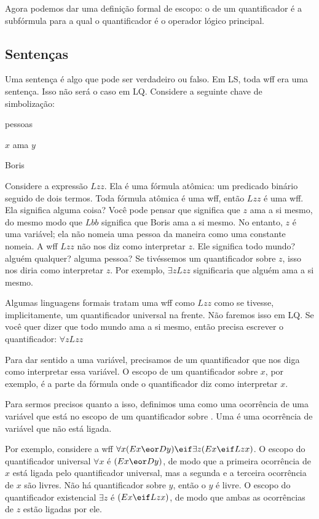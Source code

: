 Agora podemos dar uma definição formal de escopo: o  de um quantificador é a subfórmula para a qual o quantificador é o operador lógico principal. 

\subsection{Sentenças}

Uma {sentença} é algo que pode ser verdadeiro ou falso. Em LS, toda wff era uma sentença. Isso não será o caso em LQ. Considere a seguinte chave de simbolização:
\begin{ekey}
\item[UD:] pessoas
\item[Lxy:] $x$ ama $y$
\item[b:] Boris
\end{ekey}
Considere a expressão $Lzz$. Ela é uma fórmula atômica: um predicado binário seguido de dois termos. Toda fórmula atômica é uma wff, então $Lzz$ é uma wff. Ela significa alguma coisa? Você pode pensar que significa que $z$ ama a si mesmo, do mesmo modo que $Lbb$ significa que Boris ama a si mesmo. No entanto, $z$ é uma variável; ela não nomeia uma pessoa da maneira como uma constante nomeia. A wff $Lzz$ não nos diz como interpretar $z$. Ele significa todo mundo? alguém qualquer? alguma pessoa? Se tivéssemos um quantificador sobre $z$, isso nos diria como interpretar $z$. Por exemplo, $\exists zLzz$ significaria que alguém ama a si mesmo.

Algumas linguagens formais tratam uma wff como $Lzz$ como se tivesse, implicitamente, um quantificador universal na frente. Não faremos isso em LQ. Se você quer dizer que todo mundo ama a si mesmo, então precisa escrever o quantificador: $\forall zLzz$

Para dar sentido a uma variável, precisamos de um quantificador que nos diga como interpretar essa variável. O escopo de um quantificador sobre $x$, por exemplo, é a parte da fórmula onde o quantificador diz como interpretar $x$.

Para sermos precisos quanto a isso, definimos uma  como uma ocorrência de uma variável  que está no escopo de um quantificador sobre . Uma  é uma ocorrência de variável que não está ligada.

Por exemplo, considere a wff $\forall x(Ex \eor Dy) \eif \exists z(Ex \eif Lzx)$. O escopo do quantificador universal $\forall x$ é $(Ex \eor Dy)$, de modo que a primeira ocorrência de $x$ está ligada pelo quantificador universal, mas a segunda e a terceira ocorrência de $x$ são livres. Não há quantificador sobre $y$, então o $y$ é livre. O escopo do quantificador existencial $\exists z$ é $(Ex \eif Lzx)$, de modo que ambas as ocorrências de $z$ estão ligadas por ele.


